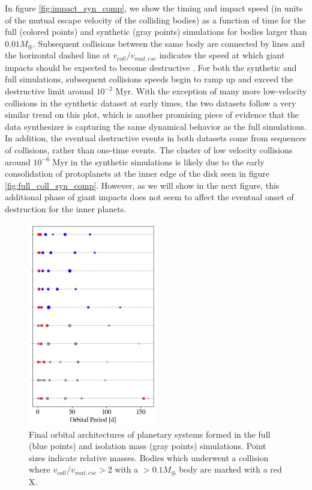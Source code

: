 In figure \ref{fig:impact_syn_comp}, we show the timing and impact speed (in units of the mutual escape velocity of the colliding bodies) as a function of time for the full (colored points) and synthetic (gray points) simulations for bodies larger than $0.01 M_{\oplus}$. Subsequent collisions between the same body are connected by lines and the horizontal dashed line at $v_{coll}/v_{mut, esc}$ indicates the speed at which giant impacts should be expected to become destructive \cite{marcus09}. For both the synthetic and full simulations, subsequent collisions speeds begin to ramp up and exceed the destructive limit around $10^{-2}$ Myr. With the exception of many more low-velocity collisions in the synthetic dataset at early times, the two datasets follow a very similar trend on this plot, which is another promising piece of evidence that the data synthesizer is capturing the same dynamical behavior as the full simulations. In addition, the eventual destructive events in both datasets come from sequences of collisions, rather than one-time events. The cluster of low velocity collisions around $10^{-6}$ Myr in the synthetic simulations is likely due to the early consolidation of protoplanets at the inner edge of the disk seen in figure \ref{fig:full_coll_syn_comp}. However, as we will show in the next figure, this additional phase of giant impacts does not seem to affect the eventual onset of destruction for the inner planets.

\begin{figure}
\begin{center}
    \includegraphics[width=0.5\textwidth]{figures/stip/architectures_syn_comp.png}
    \caption{Final orbital architectures of planetary systems formed in the full (blue points) and isolation mass (gray points) simulations. Point sizes indicate relative masses. Bodies which underwent a collision where $v_{coll}/v_{mut,esc} > 2$ with a $> 0.1 M_{\oplus}$ body are marked with a red X.\label{fig:architectures_syn_comp}}
\end{center}
\end{figure}

